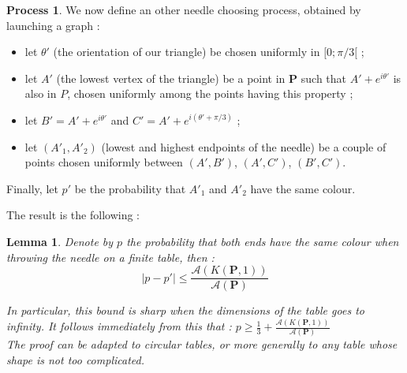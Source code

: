 \documentclass[a4paper,11pt]{article}
\newtheorem{lemma}{Lemma}
\theoremstyle{definition}
\newtheorem{process}{Process}
\theoremstyle{remark}
\begin{document}
\begin{process}
We now define an other needle choosing process, obtained by launching a graph :
\begin{itemize}
  \item let $\theta '$ (the orientation of our triangle) be chosen uniformly 
  in $[0;\pi / 3[$ ;
  \item let $A'$ (the lowest vertex of the triangle) be a point in $\mathbf{P}$ such 
  that $A' + e^{i\theta '}$ is also in $P$, chosen uniformly among the points 
  having this property ;
  \item let $B' = A' + e^{i \theta '}$ and $C' = A' + e^{i (\theta ' + \pi / 3 ) }$ ;
  \item let $(A'_1,A'_2)$ (lowest and highest endpoints of the needle) be a 
  couple of points chosen uniformly between $(A',B')$, $(A',C')$, $(B',C')$.
\end{itemize}
Finally, let $p'$ be the probability that $A'_1$ and $A'_2$ have the same 
colour.
\end{process}


The result is the following :
\begin{lemma}
Denote by $p$ the probability that both ends have the same colour when throwing 
the needle on a finite table, then :
 $$ | p - p'| \leq \frac{\mathcal{A}(K(\mathbf{P},1))}{\mathcal{A}(\mathbf{P})} $$

In particular, this bound is sharp when the dimensions of the table goes to 
infinity. It follows immediately from this that : $p \geq \frac13 + \frac{\mathcal{A}(K(\mathbf{P},1))}{\mathcal{A}(\mathbf{P})} $ \\
The proof can be adapted to circular tables, or more generally to any table 
whose shape is not too complicated. \\
\end{lemma}
\end{document}
